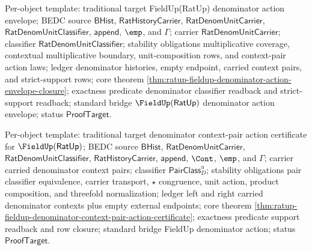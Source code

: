 Per-object template: traditional target FieldUp(RatUp) denominator action
envelope; BEDC source $\mathsf{BHist}$, $\mathsf{RatHistoryCarrier}$,
$\mathsf{RatDenomUnitCarrier}$, $\mathsf{RatDenomUnitClassifier}$,
$\mathsf{append}$, $\emp$, and $\Gamma$; carrier
$\mathsf{RatDenomUnitCarrier}$; classifier
$\mathsf{RatDenomUnitClassifier}$; stability obligations multiplicative
coverage, contextual multiplicative boundary, unit-composition rows, and
context-pair action laws; ledger denominator histories, empty endpoint,
carried context pairs, and strict-support rows; core theorem
\autoref{thm:ratup-fieldup-denominator-action-envelope-closure}; exactness
predicate denominator classifier readback and strict-support readback; standard
bridge $\FieldUp(\mathsf{RatUp})$ denominator action envelope; status
$\mathsf{ProofTarget}$.

Per-object template: traditional target denominator context-pair action
certificate for $\FieldUp(\mathsf{RatUp})$; BEDC source $\mathsf{BHist}$,
$\mathsf{RatDenomUnitCarrier}$, $\mathsf{RatDenomUnitClassifier}$,
$\mathsf{RatHistoryCarrier}$, $\mathsf{append}$, $\Cont$, $\emp$, and
$\Gamma$; carrier carried denominator context pairs; classifier
$\mathsf{PairClass}_D^u$; stability obligations pair classifier equivalence,
carrier transport, $\star$ congruence, unit action, product composition, and
threefold normalization; ledger left and right carried denominator contexts
plus empty external endpoints; core theorem
\autoref{thm:ratup-fieldup-denominator-context-pair-action-certificate};
exactness predicate support readback and row closure; standard bridge FieldUp
denominator action; status $\mathsf{ProofTarget}$.

